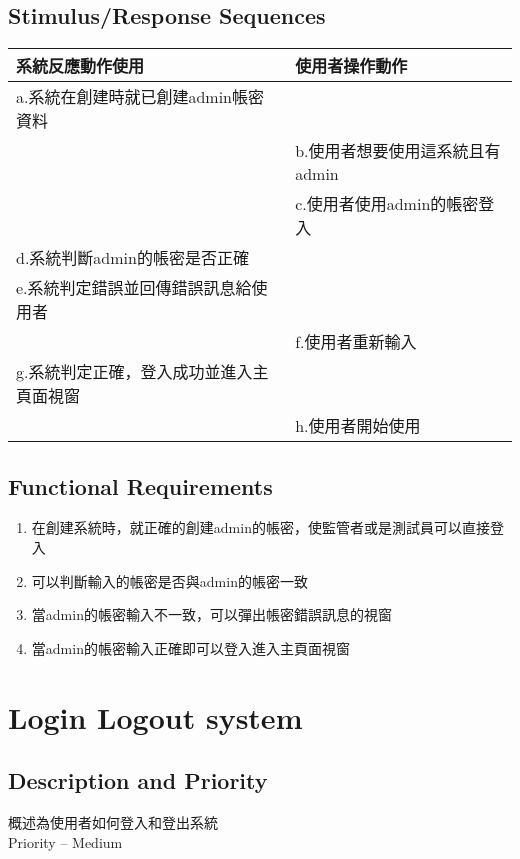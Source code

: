 \documentclass{scrreprt}
\begin{document}
\begin{CJK*}{UTF8}{bsmi}
\subsection{Stimulus/Response Sequences}
\begin{center}
\begin{tabular}{|l|l|}\hline
系統反應動作使用 & 使用者操作動作  \\ \hline
 a.系統在創建時就已創建admin帳密資料&   \\ \hline
 & 	b.使用者想要使用這系統且有admin  \\\hline
 & c.使用者使用admin的帳密登入  \\\hline
d.系統判斷admin的帳密是否正確&   \\\hline
e.系統判定錯誤並回傳錯誤訊息給使用者	&   \\\hline
 & f.使用者重新輸入  \\\hline
g.系統判定正確，登入成功並進入主頁面視窗&   \\\hline
 & h.使用者開始使用	 \\\hline
\end{tabular}
\end{center}
\subsection{Functional Requirements}
\begin{enumerate}
\item 在創建系統時，就正確的創建admin的帳密，使監管者或是測試員可以直接登入
\item 可以判斷輸入的帳密是否與admin的帳密一致
\item 當admin的帳密輸入不一致，可以彈出帳密錯誤訊息的視窗
\item 當admin的帳密輸入正確即可以登入進入主頁面視窗
\end{enumerate}
\section{Login Logout system}
\subsection{Description and Priority}
概述為使用者如何登入和登出系統\\
Priority – Medium

\end{CJK*}
\end{document}
